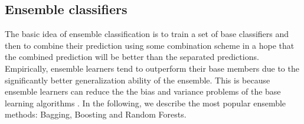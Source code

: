 \documentclass[a4paper,10pt,onecolumn,preprint,3p]{elsarticle}
\begin{document}
\subsection{Ensemble classifiers}
\label{subsec:ensembles}

The basic idea of ensemble classification is to train a set of base classifiers and then to combine their prediction using some combination scheme in a hope that the combined prediction will be better than the separated predictions. Empirically, ensemble learners tend to outperform their base members due to the significantly better generalization ability of the ensemble. This is because ensemble learners can reduce the the bias and variance problems of the base learning algorithms \cite{dietterich2002ensemble}. In the following, we describe the most popular ensemble methods: Bagging, Boosting and Random Forests.
\end{document}
